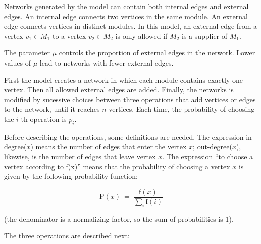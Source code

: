 Networks generated by the model can contain both internal edges and external
edges. An internal edge connects two vertices in the same module. An external
edge connects vertices in distinct modules. In this model, an external edge from
a vertex $v_1 \in M_1$ to a vertex $v_2 \in M_2$ is only allowed if $M_2$ is a
supplier of $M_1$.

The parameter $\mu$ controls the proportion of external edges in the network.
Lower values of $\mu$ lead to networks with fewer external edges. 

First the model creates a network in which each module contains exactly one
vertex. Then all allowed external edges are added. Finally, the networks is
modified by sucessive choices between three operations that add vertices or
edges to the network, until it reaches $n$ vertices. Each time, the probability
of choosing the $i$-th operation is $p_i$.

Before describing the operations, some definitions are needed. The expression
in-degree($x$) means the number of edges that enter the vertex $x$;
out-degree($x$), likewise, is the number of edges that leave vertex $x$. The
expression ``to choose a vertex according to f(x)'' means that the probability
of choosing a vertex $x$ is given by the following probability function:

$$
  \mathrm{P}(x) ~=~ \frac{ \mathrm{f}(x) }
  { \displaystyle\sum_{i} \mathrm{f}(i) }
$$

(the denominator is a normalizing factor, so the sum of probabilities is 1).

The three operations are described next:

